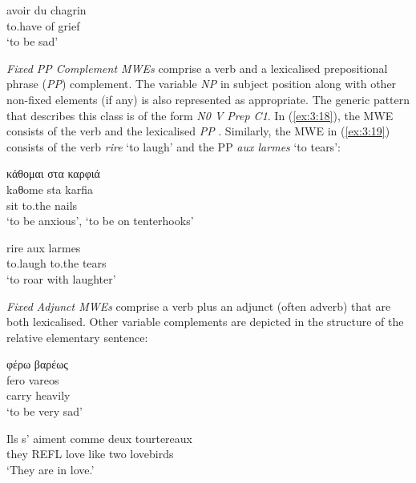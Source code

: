\documentclass[output=paper]{langsci/langscibook}
\begin{document}
\begin{exe}
\ex \label{ex:3:17}
\gll avoir du chagrin \\
to.have of grief\\
\glt ‘to be sad’\\
\end{exe}

\textit{Fixed PP Complement MWEs} comprise a verb and a lexicalised
prepositional phrase (\textit{PP}) complement. The variable \textit{NP}
in subject position along with other non-fixed elements (if any) is
also represented as appropriate. The generic pattern that describes
this class is of the form \textit{N0 V Prep C1}. In  (\ref{ex:3:18}), the  MWE consists of the verb 
and the lexicalised \textit{PP} 
.
Similarly, the  MWE in (\ref{ex:3:19}) consists of the verb \textit{rire }‘to
laugh’ and the PP \textit{aux larmes }‘to tears’:


\begin{exe}
\ex \label{ex:3:18}
\glll  κάθομαι στα καρφιά \\
kaθome sta karfia\\
sit to.the nails\\
\glt %
‘to be anxious’, ‘to be on tenterhooks’
\end{exe}

\begin{exe}
\ex \label{ex:3:19}
\gll  rire aux larmes \\
to.laugh to.the tears\\
\glt ‘to roar with laughter’
\end{exe}

\textit{Fixed}\textit{ Adjunct MWEs} comprise a verb plus an
adjunct (often adverb) that are both lexicalised. Other variable
complements are depicted in the structure of the relative elementary
sentence:

\begin{exe}
\ex \label{ex:3:20}
\glll   φέρω βαρέως \\
fero vareos\\
carry heavily\\
\glt %
‘to be very sad’
\end{exe}

\begin{exe}
\ex \label{ex:3:21}
\gll Ils s’ aiment comme deux tourtereaux \\
they REFL love like two lovebirds\\
\glt ‘They are in love.’
\end{exe}
\end{document}
